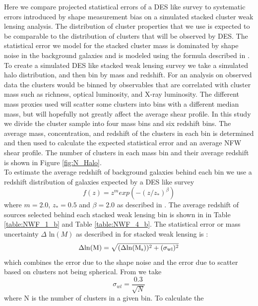 Here we compare projected statistical errors of a DES like survey 
to systematic errors introduced by shape measurement bias on 
a simulated stacked cluster weak lensing
analysis. The distribution of cluster properties that we use is 
expected to be comparable to the distribution of clusters that will
be observed by DES. The statistical error we model for the stacked
cluster mass is dominated by shape noise in the background galaxies
and is modeled using the formula described in \citep{obscos, mbecker}.
\indent To create a simulated DES like stacked weak lensing survey we
take a simulated halo distribution, and then bin by mass and
redshift. For an analysis on observed data the clusters would
be binned by observables that are correlated with cluster mass such as richness,
optical luminosity, and X-ray luminosity. The different mass proxies used will
scatter some clusters into bins with a different median mass, but
will hopefully not greatly affect the average shear profile. In this
study we divide the cluster sample into four mass bins and six
redshift bins. The average mass, concentration, and redshift of the
clusters in each bin is determined and then used to calculate the
expected statistical error and an average NFW shear profile.  The
number of clusters in each mass bin and their average redshift is
shown in Figure \ref{fig:N_Halo}. \\  
\indent To estimate the average redshift of background galaxies behind
each bin 
we use a redshift distribution of galaxies expected by a DES like survey
\begin{equation}
f(z) = z^m exp(-( z/z_* )^{\beta}) 
\end{equation}
where $m=2.0 $, $z_*=0.5$ and $\beta = 2.0 $ as described in
\citep{obscos}. The average redshift of sources selected behind each
stacked weak lensing bin is shown in in Table
\ref{table:NWF_1_b} and Table \ref{table:NWF_4_b}.
\indent
The statistical error or mass uncertainty $\Delta$ ln$(M)$ as
described in \citet{obscos} for stacked weak lensing is :
\begin{equation}
\Delta \rm{ln}(M) = \sqrt{ (\Delta  \rm{ln} (M_{s}))^2 +
(\sigma_{wl} )^2 }
\end{equation}
which combines the error due to the shape noise and the error due to
scatter based on clusters not being spherical. From \citep{mbecker}
we take
\begin{equation}
\sigma_{wl} = \frac{0.3}{\sqrt{N}}
\end{equation}
where N is the number of clusters in a given bin. To calculate the
